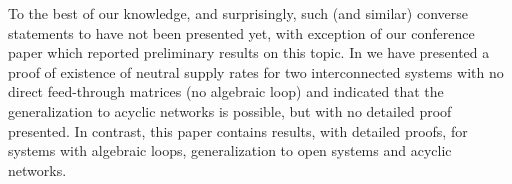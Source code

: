 \documentclass[11pt,a4paper,oneside,DIV=12,headings=small]{scrartcl}
\theoremstyle{plain}
\begin{document}
%  
%
%

To the best of our knowledge, and surprisingly, such (and similar) converse statements to \cite[Theorem~5]{Willems_1} have not been presented yet, with exception of our conference paper \cite{JokicNakic_MTNS} which reported preliminary results on this topic. In \cite{JokicNakic_MTNS} we have presented a proof of existence of neutral supply rates for two interconnected systems with no direct feed-through matrices (no algebraic loop) and indicated that the generalization to acyclic networks is possible, but with no detailed proof presented. In contrast, this paper contains results, with detailed proofs, for systems with algebraic loops, generalization to open systems and acyclic networks.  
\end{document}
